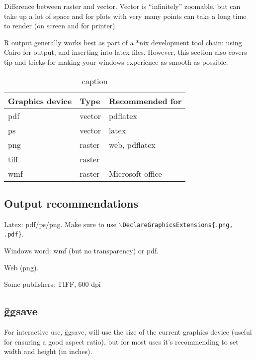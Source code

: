 Difference between raster and vector.  Vector is ``infinitely'' zoomable, but can take up a lot of space and for plots with very many points can take a long time to render (on screen and for printer).

R output generally works best as part of a *nix development tool chain: using Cairo for output, and inserting into latex files.  However, this section also covers tip and tricks for making your windows experience as smooth as possible.

\begin{table}
  \begin{center}
  \begin{tabular}{lll}
    \toprule
    Graphics device & Type & Recommended for \\
    \midrule
    pdf   & vector & pdflatex\\
    ps    & vector & latex \\
    png   & raster & web, pdflatex \\
    tiff  & raster & \\
    wmf   & raster & Microsoft office \\
    \bottomrule 
  \end{tabular}
  \end{center}
  \caption{caption}
  \label{label}
\end{table}

\subsection{Output recommendations}
\label{sub:output_recommendations}

Latex: pdf/ps/png.  Make sure to use \texttt{$\backslash$DeclareGraphicsExtensions\{.png, .pdf\}}.  

Windows word: wmf (but no transparency) or pdf.

Web (png).  

Some publishers: TIFF, 600 dpi

\subsection{\f{ggsave}}
\label{sub:ggsave}

For interactive use, \f{ggsave}, will use the size of the current graphics device (useful for ensuring a good aspect ratio), but for most uses it's recommending to set width and height (in inches).



